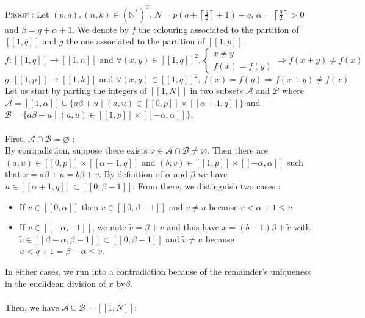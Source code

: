 \textsc{Proof :} Let \((p,q), (n,k) \in (\mathbb{N}^*)^2\), \(N = p(q+\left \lceil \frac{q}{2} \right \rceil + 1)+q\),
\(\alpha = \left \lceil \frac{q}{2} \right \rceil > 0\) and \(\beta = q + \alpha + 1\).
We denote by \(f\) the colouring associated to the partition of \([\![1,q]\!]\) and \(g\) the
one associated to the partition of \([\![1,p]\!]\).
\[ f : [\![1,q]\!] \longrightarrow [\![1,n]\!] \text{ and } \forall (x,y) \in [\![1,q]\!]^2, \left\{
\begin{array}{ll}
	x \neq y \\
	f(x) = f(y)
\end{array}
\right.
\Longrightarrow f(x+y) \neq f(x)
\]
\[g : [\![1,p]\!] \longrightarrow [\![1,k]\!] \text{ and } \forall (x,y) \in [\![1,q]\!]^2 \text{, } f(x) = f(y)
\Longrightarrow f(x+y) \neq f(x)
\]
Let us start by parting the integers of \([\![1,N]\!]\) in two subsets \(\mathcal{A}\) and \(\mathcal{B}\) where
\(\mathcal{A} = [\![1,\alpha]\!] \cup \{a\beta + u \mid (a,u) \in [\![0,p]\!] \times [\![\alpha + 1,q]\!]\}\) and
\(\mathcal{B} = \{a\beta + u \mid (a,u) \in [\![1,p]\!] \times [\![-\alpha,\alpha]\!]\}\).\\
\\
First, \underline{\(\mathcal{A} \cap \mathcal{B} = \varnothing\)} : \\
By contradiction, suppose there exists \(x \in \mathcal{A} \cap \mathcal{B} \neq \varnothing \). Then there are \((a,u)
\in [\![0,p]\!] \times [\![\alpha + 1,q]\!]\) and \((b,v) \in [\![1,p]\!] \times [\![-\alpha,\alpha]\!]\) such that \(x
= a\beta + u = b\beta +v\). By definition of \(\alpha\) and \(\beta\) we have \(u \in [\![\alpha + 1,q]\!] \subset
[\![0,\beta - 1]\!]\).
From there, we distinguish two cases :
\begin{itemize}
\item If \(v \in [\![0,\alpha]\!]\) then \(v \in [\![0,\beta - 1]\!]\) and \(v \neq u\) because \(v < \alpha + 1
\leqslant u\)
\item If \(v \in [\![-\alpha,-1]\!]\), we note \(\tilde{v} = \beta + v\) and thus have \(x = (b-1)\beta + \tilde{v}\)
with \(\tilde{v} \in [\![\beta - \alpha,\beta - 1]\!] \subset [\![0,\beta - 1]\!]\) and \(\tilde{v} \neq u\) because
\(u< q+1 = \beta - \alpha \leqslant \tilde{v}\).
\end{itemize}
In either cases, we run into a contradiction because of the remainder's uniqueness in the euclidean division of \(x\)
by\(\beta\).\\
\\
Then, we have \underline{\(\mathcal{A} \cup \mathcal{B} = [\![1,N]\!]\)}:
